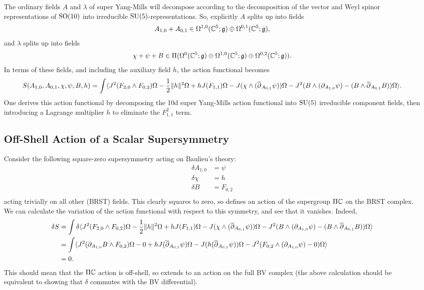 \documentclass[10pt, oneside]{article}
\begin{document}
The ordinary fields $A$ and $\lambda$ of super Yang-Mills will decompose according to the decomposition of the vector and Weyl spinor representations of $\mathrm{SO}(10)$ into irreducible $\mathrm{SU}(5)$-representations.  So, explicitly $A$ splits up into fields
\[A_{1,0} + A_{0,1} \in \Omega^{1,0}(\mathbb{C}^5; \mathfrak{g}) \oplus \Omega^{0,1}(\mathbb{C}^5; \mathfrak{g}),\]
and $\lambda$ splits up into fields
\[\chi + \psi + B \in \Pi(\Omega^0(\mathbb{C}^5; \mathfrak{g}) \oplus \Omega^{1,0}(\mathbb{C}^5; \mathfrak{g}) \oplus \Omega^{0,2}(\mathbb{C}^5; \mathfrak{g})).\]
In terms of these fields, and including the auxiliary field $h$, the action functional becomes
\[S(A_{1,0}, A_{0,1}, \chi, \psi, B, h) = \int \langle J^2(F_{2, 0}\wedge F_{0,2})\Omega - \frac 12 \|h\|^2\Omega + h J(F_{1,1}) \Omega - J( \chi \wedge (\overline{\partial}_{A_{0,1}} \psi)) \Omega - J^2(B \wedge (\partial_{A_{1,0}} \psi) - (B \wedge \overline{\partial}_{A_{0,1}} B)) \Omega \rangle.\]
One derives this action functional by decomposing the 10d super Yang-Mills action functional into $\mathrm{SU}(5)$ irreducible component fields, then introducing a Lagrange multiplier $h$ to eliminate the $F_{1,1}^2$ term.

\subsection{Off-Shell Action of a Scalar Supersymmetry}

Consider the following square-zero supersymmetry acting on Baulieu's theory:
\begin{align*}
\delta A_{1,0} &= \psi \\
\delta \chi &= h \\
\delta B &= F_{0,2} \\
\end{align*}
acting trivially on all other (BRST) fields.  This clearly squares to zero, so defines an action of the supergroup $\Pi \mathbb{C}$ on the BRST complex.  We can calculate the variation of the action functional with respect to this symmetry, and see that it vanishes.  Indeed,
\begin{align*}
\delta S &= \int \delta \langle J^2(F_{2, 0}\wedge F_{0,2})\Omega - \frac 12 \|h\|^2\Omega + h J(F_{1,1}) \Omega - J( \chi \wedge (\overline{\partial}_{A_{0,1}} \psi)) \Omega - J^2(B \wedge (\partial_{A_{1,0}} \psi) - (B \wedge \overline{\partial}_{A_{0,1}} B)) \Omega \rangle \\
&= \int \langle J^2(\partial_{A_{1,0}} B \wedge F_{0,2})\Omega - 0 + h J(\overline{\partial}_{A_{0,1}} \psi) \Omega - J( h (\overline{\partial}_{A_{0,1}} \psi)) \Omega - J^2(F_{0,2} \wedge (\partial_{A_{1,0}} \psi) - 0) \Omega \rangle \\
&= 0.
\end{align*}
This should mean that the $\Pi \mathbb{C}$ action is off-shell, so extends to an action on the full BV complex (the above calculation should be equivalent to showing that $\delta$ commutes with the BV differential).
\end{document}

